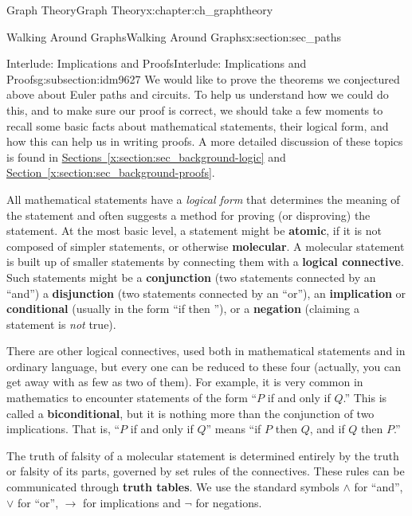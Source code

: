 \documentclass[oneside,10pt,]{book}
\newcommand{\terminology}[1]{\textbf{#1}}
\numberwithin{equation}{chapter}
\def\imp{\rightarrow}
\begin{document}
\begin{chapterptx}{Graph Theory}{}{Graph Theory}{}{}{x:chapter:ch_graphtheory}
\begin{sectionptx}{Walking Around Graphs}{}{Walking Around Graphs}{}{}{x:section:sec_paths}
\typeout{************************************************}
%
\begin{subsectionptx}{Interlude: Implications and Proofs}{}{Interlude: Implications and Proofs}{}{}{g:subsection:idm9627}
We would like to prove the theorems we conjectured above about Euler paths and circuits.  To help us understand how we could do this, and to make sure our proof is correct, we should take a few moments to recall some basic facts about mathematical statements, their logical form, and how this can help us in writing proofs.  A more detailed discussion of these topics is found in \hyperref[x:section:sec_background-logic]{Sections~\ref{x:section:sec_background-logic}} and \hyperref[x:section:sec_background-proofs]{Section~\ref{x:section:sec_background-proofs}}.%
\par
All mathematical statements have a \emph{logical form} that determines the meaning of the statement and often suggests a method for proving (or disproving) the statement.  At the most basic level, a statement might be \terminology{atomic}, if it is not composed of simpler statements, or otherwise \terminology{molecular}.  A molecular statement is built up of smaller statements by connecting them with a \terminology{logical connective}. Such statements might be a \terminology{conjunction} (two statements connected by an ``and'') a \terminology{disjunction} (two statements connected by an ``or''), an \terminology{implication} or \terminology{conditional} (usually in the form ``if \textellipsis{} then \textellipsis{}''), or a \terminology{negation} (claiming a statement is \emph{not} true).%
\par
There are other logical connectives, used both in mathematical statements and in ordinary language, but every one can be reduced to these four (actually, you can get away with as few as two of them).   For example, it is very common in mathematics to encounter statements of the form ``\(P\) if and only if \(Q\).''  This is called a \terminology{biconditional}, but it is nothing more than the conjunction of two implications.  That is, ``\(P\) if and only if \(Q\)'' means ``if \(P\) then \(Q\), and if \(Q\) then \(P\).''%
\par
The truth of falsity of a molecular statement is determined entirely by the truth or falsity of its parts, governed by set rules of the connectives.  These rules can be communicated through \terminology{truth tables}.  We use the standard symbols \(\wedge\) for ``and'', \(\vee\) for ``or'', \(\imp\) for implications and \(\neg\) for negations.%

\end{subsectionptx}
\end{sectionptx}
\end{chapterptx}
\end{document}

